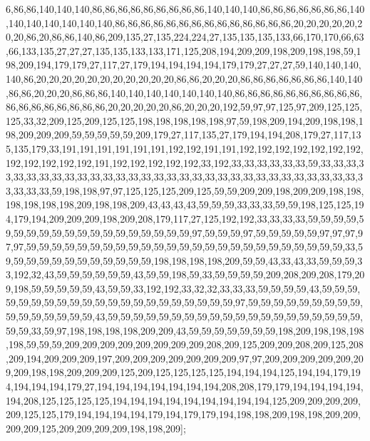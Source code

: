 6,86,86,140,140,140,86,86,86,86,86,86,86,86,86,140,140,140,86,86,86,86,86,86,86,140,140,140,140,140,140,140,86,86,86,86,86,86,86,86,86,86,86,86,86,86,20,20,20,20,20,20,20,86,20,86,86,140,86,209,135,27,135,224,224,27,135,135,135,133,66,170,170,66,63,66,133,135,27,27,27,135,135,133,133,171,125,208,194,209,209,198,209,198,198,59,198,209,194,179,179,27,117,27,179,194,194,194,194,179,179,27,27,27,59,140,140,140,140,86,20,20,20,20,20,20,20,20,20,20,20,86,86,20,20,20,86,86,86,86,86,86,86,140,140,86,86,20,20,20,86,86,86,140,140,140,140,140,140,140,86,86,86,86,86,86,86,86,86,86,86,86,86,86,86,86,86,86,20,20,20,20,20,86,20,20,20,192,59,97,97,125,97,209,125,125,125,33,32,209,125,209,125,125,198,198,198,198,198,97,59,198,209,194,209,198,198,198,209,209,209,59,59,59,59,59,209,179,27,117,135,27,179,194,194,208,179,27,117,135,135,179,33,191,191,191,191,191,191,192,192,191,191,192,192,192,192,192,192,192,192,192,192,192,192,191,192,192,192,192,192,33,192,33,33,33,33,33,33,59,33,33,33,33,33,33,33,33,33,33,33,33,33,33,33,33,33,33,33,33,33,33,33,33,33,33,33,33,33,33,33,33,33,33,33,59,198,198,97,97,125,125,125,209,125,59,59,209,209,198,209,209,198,198,198,198,198,198,209,198,198,209,43,43,43,43,59,59,59,33,33,33,59,59,198,125,125,194,179,194,209,209,209,198,209,208,179,117,27,125,192,192,33,33,33,33,59,59,59,59,59,59,59,59,59,59,59,59,59,59,59,59,59,59,59,97,59,59,59,97,59,59,59,59,59,97,97,97,97,97,59,59,59,59,59,59,59,59,59,59,59,59,59,59,59,59,59,59,59,59,59,59,59,59,59,33,59,59,59,59,59,59,59,59,59,59,59,59,198,198,198,198,209,59,59,43,33,43,33,59,59,59,33,192,32,43,59,59,59,59,59,59,43,59,59,198,59,33,59,59,59,59,209,208,209,208,179,209,198,59,59,59,59,59,43,59,59,33,192,192,33,32,32,33,33,33,59,59,59,59,43,59,59,59,59,59,59,59,59,59,59,59,59,59,59,59,59,59,59,59,59,59,97,59,59,59,59,59,59,59,59,59,59,59,59,59,59,59,59,43,59,59,59,59,59,59,59,59,59,59,59,59,59,59,59,59,59,59,59,59,59,59,33,59,97,198,198,198,198,209,209,43,59,59,59,59,59,59,59,198,209,198,198,198,198,59,59,59,209,209,209,209,209,209,209,209,208,209,125,209,209,208,209,125,208,209,194,209,209,209,197,209,209,209,209,209,209,209,97,97,209,209,209,209,209,209,209,198,198,209,209,209,125,209,125,125,125,125,194,194,194,125,194,194,179,194,194,194,194,179,27,194,194,194,194,194,194,194,208,208,179,179,194,194,194,194,194,208,125,125,125,125,194,194,194,194,194,194,194,194,194,125,209,209,209,209,209,125,125,179,194,194,194,194,179,194,179,179,194,198,198,209,198,198,209,209,209,209,125,209,209,209,209,198,198,209];

